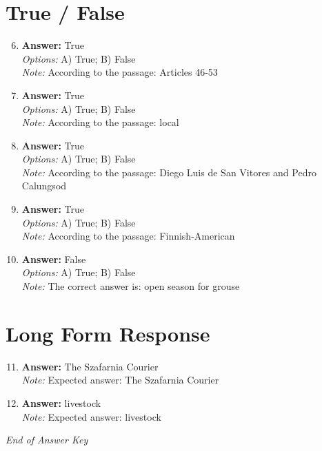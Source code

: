 \documentclass[12pt]{article}
\begin{document}
\section*{True / False}
\begin{enumerate}[label=\arabic*.]
\setcounter{enumi}{5}
\item \textbf{Answer:} True
\\ \textit{Options:} A) True; B) False
\\ \textit{Note:} According to the passage: Articles 46-53
\item \textbf{Answer:} True
\\ \textit{Options:} A) True; B) False
\\ \textit{Note:} According to the passage: local
\item \textbf{Answer:} True
\\ \textit{Options:} A) True; B) False
\\ \textit{Note:} According to the passage: Diego Luis de San Vitores and Pedro Calungsod
\item \textbf{Answer:} True
\\ \textit{Options:} A) True; B) False
\\ \textit{Note:} According to the passage: Finnish-American
\item \textbf{Answer:} False
\\ \textit{Options:} A) True; B) False
\\ \textit{Note:} The correct answer is: open season for grouse
\end{enumerate}

\section*{Long Form Response}
\begin{enumerate}[label=\arabic*.]
\setcounter{enumi}{10}
\item \textbf{Answer:} The Szafarnia Courier
\\ \textit{Note:} Expected answer: The Szafarnia Courier
\item \textbf{Answer:} livestock
\\ \textit{Note:} Expected answer: livestock
\end{enumerate}

\vfill
\noindent\textit{End of Answer Key}
\end{document}
